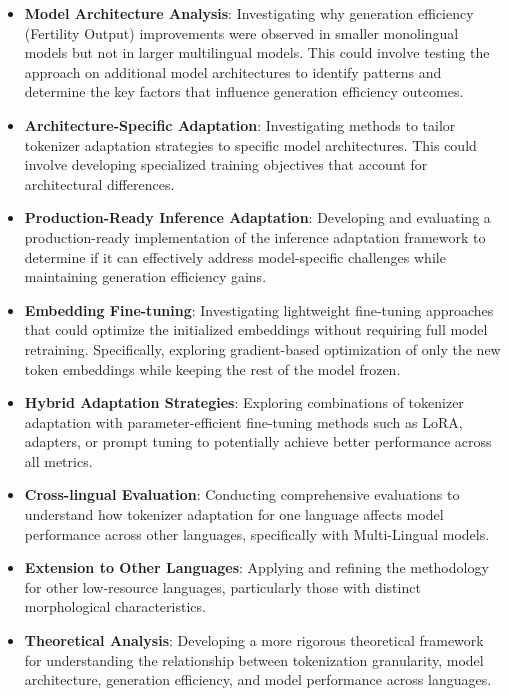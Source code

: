 \begin{itemize}
    \item \textbf{Model Architecture Analysis}: Investigating why generation efficiency (Fertility Output) improvements were observed in smaller monolingual models but not in larger multilingual models. This could involve testing the approach on additional model architectures to identify patterns and determine the key factors that influence generation efficiency outcomes.
    
    \item \textbf{Architecture-Specific Adaptation}: Investigating methods to tailor tokenizer adaptation strategies to specific model architectures. This could involve developing specialized training objectives that account for architectural differences.
    
    \item \textbf{Production-Ready Inference Adaptation}: Developing and evaluating a production-ready implementation of the inference adaptation framework to determine if it can effectively address model-specific challenges while maintaining generation efficiency gains.
    
    \item \textbf{Embedding Fine-tuning}: Investigating lightweight fine-tuning approaches that could optimize the initialized embeddings without requiring full model retraining. Specifically, exploring gradient-based optimization of only the new token embeddings while keeping the rest of the model frozen.
    
    \item \textbf{Hybrid Adaptation Strategies}: Exploring combinations of tokenizer adaptation with parameter-efficient fine-tuning methods such as LoRA, adapters, or prompt tuning to potentially achieve better performance across all metrics.
    
    \item \textbf{Cross-lingual Evaluation}: Conducting comprehensive evaluations to understand how tokenizer adaptation for one language affects model performance across other languages, specifically with Multi-Lingual models.
    
    \item \textbf{Extension to Other Languages}: Applying and refining the methodology for other low-resource languages, particularly those with distinct morphological characteristics.
    
    \item \textbf{Theoretical Analysis}: Developing a more rigorous theoretical framework for understanding the relationship between tokenization granularity, model architecture, generation efficiency, and model performance across languages.
\end{itemize}

